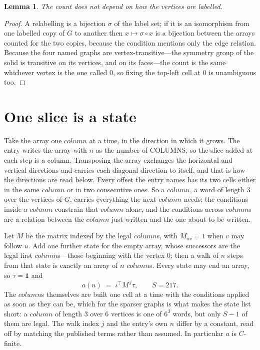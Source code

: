 \documentclass[11pt,a4paper]{article}
\theoremstyle{plain}
\newtheorem{lemma}[theorem]{Lemma}
\theoremstyle{definition}
\begin{document}
\begin{lemma}\label{lem:label}
The count does not depend on how the vertices are labelled.
\end{lemma}

\begin{proof}
A relabelling is a bijection $\sigma$ of the label set; if it is an isomorphism from one
labelled copy of $G$ to another then $x\mapsto\sigma\circ x$ is a bijection between the arrays
counted for the two copies, because the condition mentions only the edge relation.
Because the four named graphs are vertex-transitive---the symmetry group of the solid is transitive on its vertices, and on its faces---the count is the same whichever vertex is the one called $0$, so fixing the top-left cell at $0$ is unambiguous too.
\end{proof}

\section{One slice is a state}

Take the array one $column$ at a time, in the direction in which it grows. The entry writes the array with $n$ as the number of COLUMNS, so the slice added at each step is a column. Transposing the array exchanges the horizontal and vertical directions and carries each diagonal direction to itself, and that is how the directions are read below.
Every offset the entry names has its two cells either in the same $column$ or in two
consecutive ones. So a $column$, a word of length $3$ over the vertices of $G$, carries
everything the next $column$ needs: the conditions inside a $column$ constrain that
$column$ alone, and the conditions across $column$s are a relation between the
$column$ just written and the one about to be written.

Let $M$ be the matrix indexed by the legal $column$s, with $M_{uv}=1$ when $v$ may
follow $u$. Add one further state for the empty array, whose successors are the legal first
$column$s---those beginning with the vertex $0$; then a walk of
$n$ steps from that state is exactly an array of $n$ $column$s. Every state may end an
array, so $\tau=\mathbf{1}$ and
\[
a(n)\;=\;\iota^{\!\top}M^{\,j}\tau ,\qquad S=217.
\]
The $column$s themselves are built one cell at a time with the conditions applied as soon
as they can be, which for the sparser graphs is what makes the state list short: a $column$
of length $3$ over $6$ vertices is one of $6^{3}$ words, but only $S-1$ of them are
legal. The walk index $j$ and the entry's own $n$ differ by a constant, read off by matching the
published terms rather than assumed. In particular $a$ is $C$-finite.
\end{document}
